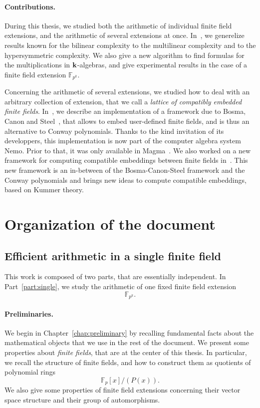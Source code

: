 \paragraph{Contributions.}

During this thesis, we studied both the arithmetic of individual finite field
extensions, and the arithmetic of several extensions at once.
In~\cite{RR21}, we generelize results known for the bilinear complexity to the
multilinear complexity and to the hypersymmetric complexity. We also give a new
algorithm to find formulas for the multiplications in $\mathbf{k}$-algebras, and give
experimental results in the case of a finite field extension
$\mathbb{F}_{p^{k}}$.

Concerning the arithmetic of several extensions, we studied how to deal with an
arbitrary collection of extension, that we call a \emph{lattice of compatibly
embedded finite fields}. In~\cite{DRR18}, we describe an implementation of a
framework due to Bosma, Canon and Steel~\cite{BCS97}, that allows to embed
user-defined finite fields, and is thus an alternative to Conway polynomials.
Thanks to the kind invitation of its developpers, this implementation is
now part of the computer algebra system Nemo. Prior to that, it was only
available in Magma~\cite{Magma}. We also worked on a new framework for computing
compatible embeddings between finite fields in~\cite{DRR19}. This new framework
is an in-between of the Bosma-Canon-Steel framework and the Conway polynomials
and brings new ideas to compute compatible embeddings, based on Kummer theory.

\section{Organization of the document}
\subsection{Efficient arithmetic in a single finite field}

This work is composed of two parts, that are essentially independent. In
Part~\ref{part:single}, we study the arithmetic of one fixed finite field
extension
\[
  \mathbb{F}_{p^k}.
\]
\paragraph{Preliminaries.} We begin in Chapter~\ref{chap:preliminary} by
recalling fundamental
facts about the mathematical objects that we use in the rest of the document. We
present some properties about \emph{finite fields}, that are at the center of
this thesis. In particular, we recall the structure of finite fields, and how to
construct them as quotients of polynomial rings
\[
  \mathbb{F}_p[x]/(P(x)).
\]
We also give some properties of finite field extensions concerning their vector
space structure and their group of automorphisms.

